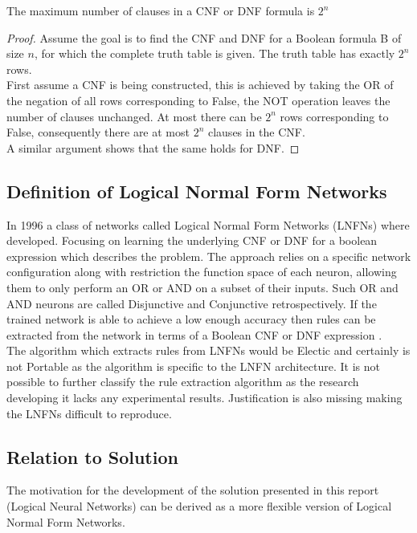 \begin{theorem}
	The maximum number of clauses in a CNF or DNF formula is $2^n$
	\label{thm:max-clause-cnfdnf}
\end{theorem}

\begin{proof}
	Assume the goal is to find the CNF and DNF for a Boolean formula B of size $n$, for which the complete truth table is given. The truth table has exactly $2^n$ rows.\\
	
	First assume a CNF is being constructed, this is achieved by taking the OR of the negation of all rows corresponding to False, the NOT operation leaves the number of clauses unchanged. At most there can be $2^n$ rows corresponding to False, consequently there are at most $2^n$ clauses in the CNF.\\
	
	A similar argument shows that the same holds for DNF.
\end{proof}

\subsection{Definition of Logical Normal Form Networks}
In 1996 a class of networks called Logical Normal Form Networks \cite{herrmann1996backpropagation} (LNFNs) where developed. Focusing on learning the underlying CNF or DNF for a boolean expression which describes the problem. The approach relies on a specific network configuration along with restriction the function space of each neuron, allowing them to only perform an OR or AND on a subset of their inputs. Such OR and AND neurons are called Disjunctive and Conjunctive retrospectively. If the trained network is able to achieve a low enough accuracy then rules can be extracted from the network in terms of a Boolean CNF or DNF expression \cite{herrmann1996backpropagation}.\\

The algorithm which extracts rules from LNFNs would be Electic and certainly is not Portable as the algorithm is specific to the LNFN architecture. It is not possible to further classify the rule extraction algorithm as the research developing it lacks any experimental results. Justification is also missing making the LNFNs difficult to reproduce.\\

\subsection{Relation to Solution}
The motivation for the development of the solution presented in this report (Logical Neural Networks) can be derived as a more flexible version of Logical Normal Form Networks.

